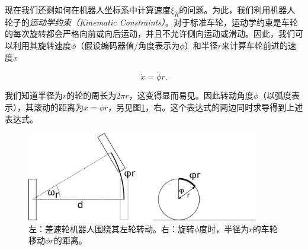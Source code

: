 
现在我们还剩如何在机器人坐标系中计算速度$\dot{\xi_R}$的问题。为此，我们利用机器人轮子的\emph{运动学约束（Kinematic Constraints）}。对于标准车轮，运动学约束是车轮的每次旋转都会严格向前或向后运动，并且不允许侧向运动或滑动。因此，我们可以利用其旋转速度$\dot{\phi}$（假设编码器值/角度表示为$\phi$）和半径$r$来计算车轮前进的速度$\dot{x}$

\begin{equation}
\dot{x}=\dot{\phi}r.
\end{equation}


我们知道半径为$r$的轮的周长为$2\pi r$，这变得显而易见。因此转动角度$\phi$（以弧度表示），其滚动的距离为$x=\phi r$，另见图\ref{fig:wheelrotation}，右。这个表达式的两边同时求导得到上述表达式。

\begin{figure}[htb!]
	\centering
		\includegraphics[width=0.9\textwidth]{figs/wheelrotation.png}
	\caption{左：差速轮机器人围绕其左轮转动。右：旋转$\phi$度时，半径为$r$的车轮移动$\phi r$的距离。}
	\label{fig:wheelrotation}
\end{figure}

